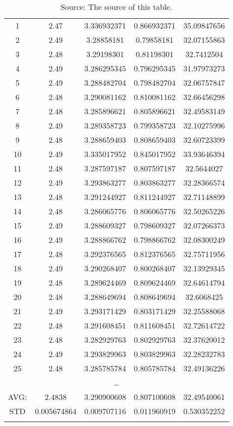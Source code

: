 \begin{center}
\begin{longtable}{c|c|c|c|c}
1	&	2.47	&	3.336932371	&	0.866932371	&	35.09847656	\\
2	&	2.49	&	3.28858181	&	0.79858181	&	32.07155863	\\
3	&	2.48	&	3.29198301	&	0.81198301	&	32.7412504	\\
4	&	2.49	&	3.286295345	&	0.796295345	&	31.97973273	\\
5	&	2.49	&	3.288482704	&	0.798482704	&	32.06757847	\\
6	&	2.48	&	3.290081162	&	0.810081162	&	32.66456298	\\
7	&	2.48	&	3.285896621	&	0.805896621	&	32.49583149	\\
8	&	2.49	&	3.289358723	&	0.799358723	&	32.10275996	\\
9	&	2.48	&	3.288659403	&	0.808659403	&	32.60723399	\\
10	&	2.49	&	3.335017952	&	0.845017952	&	33.93646394	\\
11	&	2.48	&	3.287597187	&	0.807597187	&	32.5644027	\\
12	&	2.49	&	3.293863277	&	0.803863277	&	32.28366574	\\
13	&	2.48	&	3.291244927	&	0.811244927	&	32.71148899	\\
14	&	2.48	&	3.286065776	&	0.806065776	&	32.50265226	\\
15	&	2.49	&	3.288609327	&	0.798609327	&	32.07266373	\\
16	&	2.49	&	3.288866762	&	0.798866762	&	32.08300249	\\
17	&	2.48	&	3.292376565	&	0.812376565	&	32.75711956	\\
18	&	2.49	&	3.290268407	&	0.800268407	&	32.13929345	\\
19	&	2.48	&	3.289624469	&	0.809624469	&	32.64614794	\\
20	&	2.48	&	3.288649694	&	0.808649694	&	32.6068425	\\
21	&	2.49	&	3.293171429	&	0.803171429	&	32.25588068	\\
22	&	2.48	&	3.291608451	&	0.811608451	&	32.72614722	\\
23	&	2.48	&	3.282929763	&	0.802929763	&	32.37620012	\\
24	&	2.49	&	3.293829963	&	0.803829963	&	32.28232783	\\
25	&	2.48	&	3.285785784	&	0.805785784	&	32.49136226	\\
\multicolumn{5}{c}{\ldots} \\
\bottomrule[2pt]
AVG:	&	2.4838	&	3.290900608	&	0.807100608	&	32.49540061	\\
STD	&	0.005674864	&	0.009707116	&	0.011960919	&	0.530352252	\\
\caption*{Source: The source of this table.}
\end{longtable}
\end{center}

